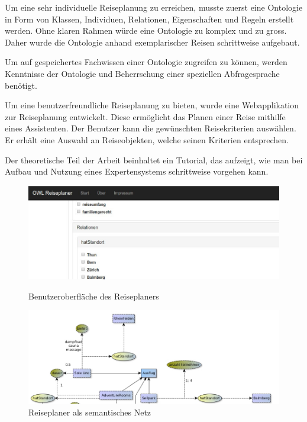 \documentclass[
    paper=a4,               %
    fontsize=10pt,          %
    open=right,             %
    titlepage=false,        %
    parskip=half,           %
]{scrreprt}                 %
\begin{document}
\begin{multicols}{3}
        Um eine sehr individuelle Reiseplanung zu erreichen, musste zuerst eine Ontologie in Form von Klassen, Individuen, Relationen, Eigenschaften und Regeln erstellt werden. Ohne klaren Rahmen würde eine Ontologie zu komplex und zu gross. Daher wurde die Ontologie anhand exemplarischer Reisen schrittweise aufgebaut.

        Um auf gespeichertes Fachwissen einer Ontologie zugreifen zu können, werden Kenntnisse der Ontologie und Beherrschung einer speziellen Abfragesprache benötigt.

        Um eine benutzerfreundliche Reiseplanung zu bieten, wurde eine Webapplikation zur Reiseplanung entwickelt. Diese ermöglicht das Planen einer Reise mithilfe eines Assistenten. Der Benutzer kann die gewünschten Reisekriterien auswählen. Er erhält eine Auswahl an Reiseobjekten, welche seinen Kriterien entsprechen.

       Der theoretische Teil der Arbeit beinhaltet ein Tutorial, das aufzeigt, wie man bei Aufbau und Nutzung eines Expertensystems schrittweise vorgehen kann.

    \end{multicols}

    \begin{figure}[htbp]
        \begin{minipage}[hbt]{0,49\textwidth}
            \centering
            \includegraphics[scale=0.3]{bilder/reiseplaner_gui.jpg}
            \caption*{Benutzeroberfläche des Reiseplaners}
        \end{minipage}
        \begin{minipage}[hbt]{0,49\textwidth}
            \centering
            \includegraphics[scale=0.3]{bilder/semantisches_netz.jpg}
            \caption*{Reiseplaner als semantisches Netz}
        \end{minipage}
    \end{figure}
\end{document}
